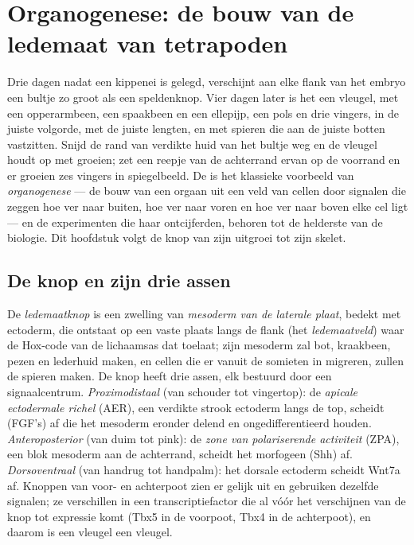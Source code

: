 \chapter{Organogenese: de bouw van de ledemaat van tetrapoden}\label{ch:b2:limb-organogenesis}

Drie dagen nadat een kippenei is gelegd, verschijnt aan elke flank van het
embryo een bultje zo groot als een speldenknop. Vier dagen later is het een
vleugel, met een opperarmbeen, een spaakbeen en een ellepijp, een pols en
drie vingers, in de juiste volgorde, met de juiste lengten, en met spieren
die aan de juiste botten vastzitten. Snijd de rand van verdikte huid van het
bultje weg en de vleugel houdt op met groeien; zet een reepje van de
achterrand ervan op de voorrand en er groeien zes vingers in spiegelbeeld.
De  is het klassieke voorbeeld van \emph{organogenese} --- de
bouw van een orgaan uit een veld van cellen door signalen die zeggen hoe ver
naar buiten, hoe ver naar voren en hoe ver naar boven elke cel ligt --- en
de experimenten die haar ontcijferden, behoren tot de helderste van de
biologie. Dit hoofdstuk volgt de knop van zijn uitgroei tot zijn skelet.

\section{De knop en zijn drie assen}

\begin{definition}[De ledemaatknop]\label{def:b2:limb-organogenesis:bud}
De \emph{ledemaatknop} is een zwelling van \emph{mesoderm van de laterale
plaat}, bedekt met ectoderm, die ontstaat op een vaste plaats langs de
flank (het \emph{ledemaatveld}) waar de Hox-code van de lichaamsas dat
toelaat; zijn mesoderm zal bot, kraakbeen, pezen en lederhuid maken, en
cellen die er vanuit de somieten in migreren, zullen de spieren maken. De
knop heeft drie assen, elk bestuurd door een signaalcentrum.
\emph{Proximodistaal} (van schouder tot vingertop): de \emph{apicale
ectodermale richel} (AER), een verdikte strook ectoderm langs de top,
scheidt  (FGF's) af die het mesoderm eronder delend
en ongedifferentieerd houden.
\emph{Anteroposterior} (van duim tot pink): de \emph{zone van
polariserende activiteit} (ZPA), een blok mesoderm aan de achterrand,
scheidt het morfogeen \emph{} (Shh) af.
\emph{Dorsoventraal} (van handrug tot handpalm): het dorsale ectoderm
scheidt Wnt7a af. Knoppen van voor- en achterpoot zien er gelijk uit en
gebruiken dezelfde signalen; ze verschillen in een transcriptiefactor die
al vóór het verschijnen van de knop tot expressie komt (Tbx5 in de
voorpoot, Tbx4 in de achterpoot), en daarom is een vleugel een vleugel.
\end{definition}

